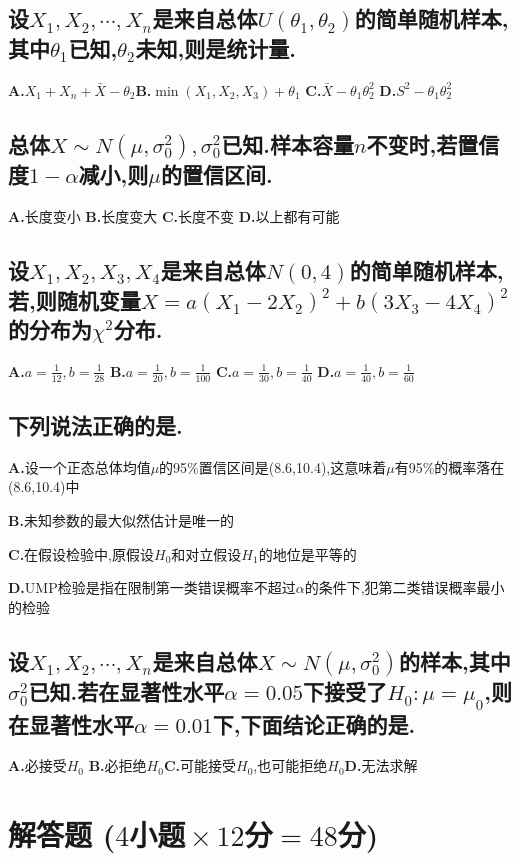 \documentclass[UTF8]{article}
\newcommand{\shortline}{\underline{\hspace{1cm}}}
\newcommand{\bfA}{\textbf{A.}}
\newcommand{\bfB}{\qquad \textbf{B.}}
\newcommand{\bfC}{\qquad \textbf{C.}}
\newcommand{\bfD}{\qquad \textbf{D.}}
\begin{document}
    \subsection{
        设$X_1,X_2,\cdots,X_n$是来自总体$U(\theta_1,\theta_2)$的简单随机样本,其中$\theta_1$已知,$\theta_2$未知,则\shortline 是统计量.
    }\bfA $X_1+X_n+\bar{X}-\theta_2$\bfB $\min(X_1,X_2,X_3)+\theta_1$ \bfC $\bar{X}-\theta_1\theta_2^2$ \bfD $S^2-\theta_1\theta_2^2$
    \subsection{
        总体$X\sim N(\mu,\sigma_0^2),\sigma_0^2$已知.样本容量$n$不变时,若置信度$1-\alpha$减小,则$\mu$的置信区间\shortline.
    }\bfA 长度变小 \bfB 长度变大 \bfC 长度不变 \bfD 以上都有可能
    \subsection{
        设$X_1,X_2,X_3,X_4$是来自总体$N(0,4)$的简单随机样本,若\shortline,则随机变量$X=a(X_1-2X_2)^2+b(3X_3-4X_4)^2$的分布为$\chi^2$分布.
    }\bfA $\displaystyle a=\frac{1}{12}, b=\frac{1}{28}$
    \bfB $\displaystyle a=\frac{1}{20}, b=\frac{1}{100}$
    \bfC $\displaystyle a=\frac{1}{30}, b=\frac{1}{40}$
    \bfD $\displaystyle a=\frac{1}{40}, b=\frac{1}{60}$
    \subsection{下列说法正确的是\shortline.}
    \qquad \bfA 设一个正态总体均值$\mu$的95\%置信区间是(8.6,10.4),这意味着$\mu$有95\%的概率落在(8.6,10.4)中\par 
    \bfB 未知参数的最大似然估计是唯一的\par 
    \bfC 在假设检验中,原假设$H_0$和对立假设$H_1$的地位是平等的\par 
    \bfD UMP检验是指在限制第一类错误概率不超过$\alpha$的条件下,犯第二类错误概率最小的检验
    \subsection{
        设$X_1,X_2,\cdots,X_n$是来自总体$X\sim N(\mu,\sigma_0^2)$的样本,其中$\sigma_0^2$已知.若在显著性水平$\alpha=0.05$下接受了$H_0:\mu=\mu_0$,则在显著性水平$\alpha=0.01$下,下面结论正确的是\shortline.
    }\bfA 必接受$H_0$ \bfB 必拒绝$H_0$\bfC 可能接受$H_0$,也可能拒绝$H_0$\bfD 无法求解

    \section{解答题 \small($4\!\!$小题$\!\!\times 12\!\!$分$\!\!=\!\!48\!\!$分)}
\end{document}
